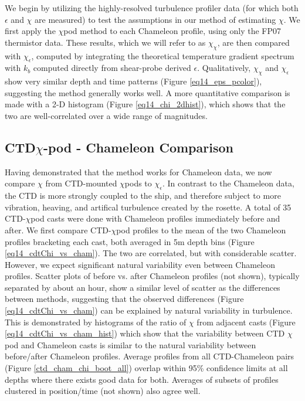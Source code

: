 \documentclass{ametsoc}
\begin{document}
We begin by utilizing the highly-resolved turbulence profiler data (for which both $\epsilon$ and $\chi$ are measured) to test the assumptions in our method of estimating $\chi$. We first apply the $\chi$pod method to each Chameleon profile, using only the FP07 thermistor data. These results, which we will refer to as $\chi_{\chi}$, are then compared with $\chi_{\epsilon}$, computed by integrating the theoretical temperature gradient spectrum with $k_b$ computed directly from shear-probe derived $\epsilon$. Qualitatively, $\chi_{\chi}$ and $\chi_{\epsilon}$ show very similar depth and time patterns (Figure \ref{eq14_eps_pcolor}), suggesting the method generally works well. A more quantitative comparison is made with a 2-D histogram (Figure \ref{eq14_chi_2dhist}), which shows that the two are well-correlated over a wide range of magnitudes. 



\subsection{ CTD$\chi$-pod - Chameleon Comparison}

Having demonstrated that the method works for Chameleon data, we now compare $\chi$ from CTD-mounted $\chi$pods to $\chi_{\epsilon}$. In contrast to the Chameleon data, the CTD is more strongly coupled to the ship, and therefore subject to more vibration, heaving, and artifical turbulence created by the rosette. A total of 35 CTD-$\chi$pod casts were done with Chameleon profiles immediately before and after. We first compare CTD-$\chi$pod profiles to the mean of the two Chameleon profiles bracketing each cast, both averaged in 5m depth bins (Figure \ref{eq14_cdtChi_vs_cham}). The two are correlated, but with considerable scatter. However, we expect significant natural variability even between Chameleon profiles. Scatter plots of before vs. after Chameleon profiles (not shown), typically separated by about an hour, show a similar level of scatter as the differences between methods, suggesting that the observed differences (Figure \ref{eq14_cdtChi_vs_cham}) can be explained by natural variability in turbulence. This is demonstrated by histograms of the ratio of $\chi$ from adjacent casts (Figure \ref{eq14_cdtChi_vs_cham_hist}) which show that the variability between CTD $\chi$pod and Chameleon casts is similar to the natural variability between before/after Chameleon profiles. Average profiles from all CTD-Chameleon pairs (Figure \ref{ctd_cham_chi_boot_all}) overlap within 95\% confidence limits at all depths where there exists good data for both. Averages of subsets of profiles clustered in position/time (not shown) also agree well. 
\end{document}
